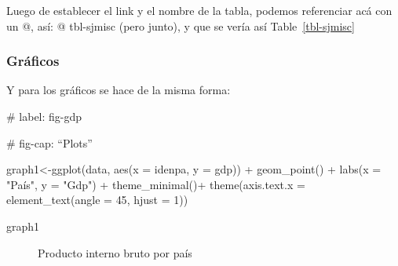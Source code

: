 \documentclass[
  letterpaper,
  DIV=11,
  numbers=noendperiod]{scrartcl}
\newenvironment{Shaded}{\begin{snugshade}}{\end{snugshade}}
\newcommand{\AttributeTok}[1]{\textcolor[rgb]{0.40,0.45,0.13}{#1}}
\newcommand{\DecValTok}[1]{\textcolor[rgb]{0.68,0.00,0.00}{#1}}
\newcommand{\FunctionTok}[1]{\textcolor[rgb]{0.28,0.35,0.67}{#1}}
\newcommand{\NormalTok}[1]{\textcolor[rgb]{0.00,0.23,0.31}{#1}}
\newcommand{\OtherTok}[1]{\textcolor[rgb]{0.00,0.23,0.31}{#1}}
\newcommand{\SpecialCharTok}[1]{\textcolor[rgb]{0.37,0.37,0.37}{#1}}
\newcommand{\StringTok}[1]{\textcolor[rgb]{0.13,0.47,0.30}{#1}}
\begin{document}
Luego de establecer el link y el nombre de la tabla, podemos referenciar
acá con un @, así: @ tbl-sjmisc (pero junto), y que se vería así
Table~\ref{tbl-sjmisc}

\subsubsection{Gráficos}\label{gruxe1ficos}

Y para los gráficos se hace de la misma forma:

\#\textbar{} label: fig-gdp

\#\textbar{} fig-cap: ``Plots''

\begin{Shaded}
\begin{Highlighting}[]
\NormalTok{graph1}\OtherTok{\textless{}{-}}\FunctionTok{ggplot}\NormalTok{(data, }\FunctionTok{aes}\NormalTok{(}\AttributeTok{x =}\NormalTok{ idenpa, }\AttributeTok{y =}\NormalTok{ gdp)) }\SpecialCharTok{+}
  \FunctionTok{geom\_point}\NormalTok{() }\SpecialCharTok{+}
  \FunctionTok{labs}\NormalTok{(}\AttributeTok{x =} \StringTok{"País"}\NormalTok{, }\AttributeTok{y =} \StringTok{"Gdp"}\NormalTok{) }\SpecialCharTok{+}
  \FunctionTok{theme\_minimal}\NormalTok{()}\SpecialCharTok{+}
  \FunctionTok{theme}\NormalTok{(}\AttributeTok{axis.text.x =} \FunctionTok{element\_text}\NormalTok{(}\AttributeTok{angle =} \DecValTok{45}\NormalTok{, }\AttributeTok{hjust =} \DecValTok{1}\NormalTok{))}

\NormalTok{graph1}
\end{Highlighting}
\end{Shaded}

\begin{figure}[H]


\caption{\label{fig-gdp}Producto interno bruto por país}

\end{figure}%
\end{document}
